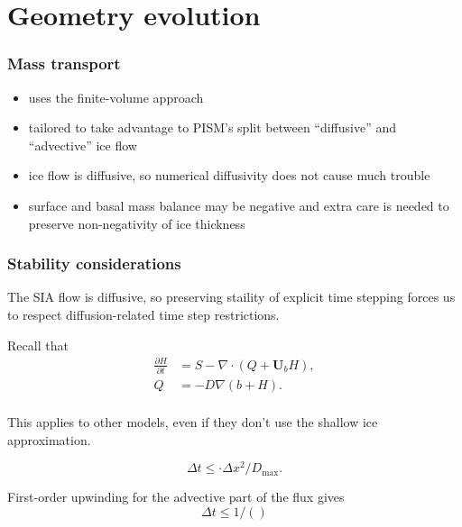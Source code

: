 \documentclass[hide notes,intlimits]{beamer}
\begin{document}

\section{Geometry evolution}
\label{sec:geometry-evolution}

\begin{frame}
  \frametitle{Mass transport}
  \begin{itemize}
  \item uses the finite-volume approach
  \item tailored to take advantage to PISM's split between
    ``diffusive'' and ``advective'' ice flow
  \item ice flow is diffusive, so numerical diffusivity does not cause
    much trouble
  \item surface and basal mass balance may be negative and extra care
    is needed to preserve non-negativity of ice thickness
  \end{itemize}
\end{frame}


\begin{frame}
  \frametitle{Stability considerations}

  The SIA flow is diffusive, so preserving staility of explicit time
  stepping forces us to respect diffusion-related time step
  restrictions.

  Recall that
  \begin{align}
    \label{eq:2}
    \frac{\partial H}{\partial t} &= S - \nabla \cdot (Q + \mathbf{U}_b H),\\
    Q &= -D \nabla (b + H).\\
  \end{align}

  This applies to other models, even if they don't use the shallow ice
  approximation.

  \begin{equation}
    \label{eq:3}
    \Delta t \le \cdot \Delta x^{2} / D_{\text{max}}.
  \end{equation}

  First-order upwinding for the advective part of the flux gives
  \begin{equation}
    \label{eq:6}
    \Delta t \le 1 / ()
  \end{equation}
\end{frame}
\end{document}

